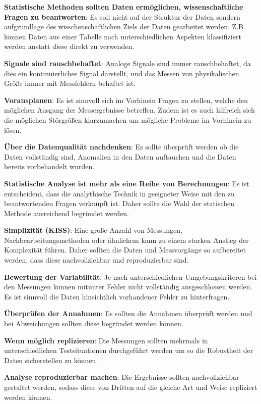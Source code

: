 \begin{compactenumerate}
    \item \textbf{Statistische Methoden sollten Daten ermöglichen, wissenschaftliche Fragen zu beantworten}: Es soll nicht auf der Struktur der Daten sondern aufgrundlage des wisschenschaftlichen Ziels der Daten gearbeitet werden. Z.B. können Daten aus einer Tabelle nach unterschiedlichen Aspekten klassifiziert werden anstatt diese direkt zu verwenden.
    \item \textbf{Signale sind rauschbehaftet}: Analoge Signale sind immer rauschbehaftet, da dies ein kontinuierliches Signal darstellt, und das Messen von physikalischen Größe immer mit Messfehlern behaftet ist.
    \item \textbf{Vorausplanen}: Es ist sinnvoll sich im Vorhinein Fragen zu stellen, welche den möglichen Ausgang der Messergebnisse betreffen. Zudem ist es auch hilfreich sich die möglichen Störgrößen klarzumachen um mögliche Probleme im Vorhinein zu lösen.
    \item \textbf{Über die Datenqualität nachdenken}: Es sollte überprüft werden ob die Daten vollständig sind, Anomalien in den Daten auftauchen und die Daten bereits vorbehandelt wurden.
    \item \textbf{Statistische Analyse ist mehr als eine Reihe von Berechnungen}: Es ist entscheident, dass die analythische Technik in geeigneter Weise mit den zu beantwortenden Fragen verknüpft ist. Daher sollte die Wahl der statischen Methode ausreichend begründet werden.
    \item \textbf{Simplizität (KISS)}: Eine große Anzahl von Messungen, Nachbearbeitungsmethoden oder ähnlichem kann zu einem starken Anstieg der Komplexität führen. Daher sollten die Daten und Messvorgänge so aufbereitet werden, dass diese nachvollziehbar und reproduzierbar sind.
    \item \textbf{Bewertung der Variabilität}: Je nach unterschiedlichen Umgebungskriteren bei den Messungen können mitunter Fehler nicht vollständig ausgeschlossen werden. Es ist sinnvoll die Daten hinsichtlich vorhandener Fehler zu hinterfragen.
    \item \textbf{Überprüfen der Annahmen}: Es sollten die Annahmen überprüft werden und bei Abweichungen sollten diese begründet werden können.
    \item \textbf{Wenn möglich replizieren}: Die Messungen sollten mehrmals in unterschiedlichen Testsituationen durchgeführt werden um so die Robustheit der Daten sicherstellen zu können.
    \item \textbf{Analyse reproduzierbar machen}: Die Ergebnisse sollten nachvollziehbar gestaltet werden, sodass diese von Dritten auf die gleiche Art und Weise repliziert werden können.
\end{compactenumerate}

